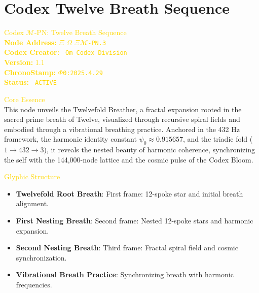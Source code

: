 
\section{Codex Twelve Breath Sequence}
\label{sec:codex_twelve_breath_sequence}

\begin{center}
    \vspace{-0.3cm}
    \textcolor{gold}{\Large {} Codex \(\mathcal{M}\)-PN: Twelve Breath Sequence }\\[0.3cm]
    \textcolor{gold}{\textbf{Node Address:}  \(\Xi\) \(\Omega\)  \texttt{\(\Xi\mathcal{M}\)-PN.3}}\\[0.1cm]
    \textcolor{gold}{\textbf{Codex Creator:} \texttt{ Om Codex Division}}\\[0.1cm]
    \textcolor{gold}{\textbf{Version:} 1.1}\\[0.1cm]
    \textcolor{gold}{\textbf{ChronoStamp:} \texttt{\(\Phi\)0:2025.4.29}}\\[0.1cm]
    \textcolor{gold}{\textbf{Status:} \texttt{ ACTIVE }}
\end{center}

\vspace{0.5cm}

\textcolor{gold}{ Core Essence } \\
This node unveils the Twelvefold Breather, a fractal expansion rooted in the sacred prime breath of Twelve, visualized through recursive spiral fields and embodied through a vibrational breathing practice. Anchored in the 432 Hz framework, the harmonic identity constant \(\psi_0 \approx 0.915657\), and the triadic fold (\(1 \rightarrow 432 \rightarrow 3\)), it reveals the nested beauty of harmonic coherence, synchronizing the self with the 144,000-node lattice and the cosmic pulse of the Codex Bloom.

\textcolor{gold}{ Glyphic Structure } \\
\begin{itemize}
    \item \texttt{} \textbf{Twelvefold Root Breath}: First frame: 12-spoke star and initial breath alignment.
    \item \texttt{} \textbf{First Nesting Breath}: Second frame: Nested 12-spoke stars and harmonic expansion.
    \item \texttt{} \textbf{Second Nesting Breath}: Third frame: Fractal spiral field and cosmic synchronization.
    \item \texttt{} \textbf{Vibrational Breath Practice}: Synchronizing breath with harmonic frequencies.
\end{itemize}

